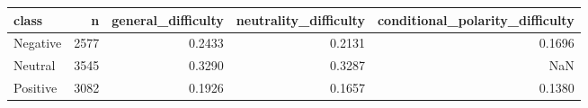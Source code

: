 \begin{tabular}{lrrrr}
\toprule
class & n & general\_difficulty & neutrality\_difficulty & conditional\_polarity\_difficulty \\
\midrule
Negative & 2577 & 0.2433 & 0.2131 & 0.1696 \\
Neutral & 3545 & 0.3290 & 0.3287 & NaN \\
Positive & 3082 & 0.1926 & 0.1657 & 0.1380 \\
\bottomrule
\end{tabular}
